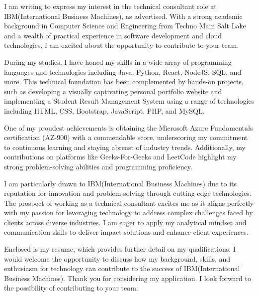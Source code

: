 I am writing to express my interest in the technical consultant role at IBM(International Business Machines), as advertised. With a strong academic background in Computer Science and Engineering from Techno Main Salt Lake and a wealth of practical experience in software development and cloud technologies, I am excited about the opportunity to contribute to your team.

During my studies, I have honed my skills in a wide array of programming languages and technologies including Java, Python, React, NodeJS, SQL, and more. This technical foundation has been complemented by hands-on projects, such as developing a visually captivating personal portfolio website and implementing a Student Result Management System using a range of technologies including HTML, CSS, Bootstrap, JavaScript, PHP, and MySQL.

One of my proudest achievements is obtaining the Microsoft Azure Fundamentals certification (AZ-900) with a commendable score, underscoring my commitment to continuous learning and staying abreast of industry trends. Additionally, my contributions on platforms like Geeks-For-Geeks and LeetCode highlight my strong problem-solving abilities and programming proficiency.

I am particularly drawn to IBM(International Business Machines) due to its reputation for innovation and problem-solving through cutting-edge technologies. The prospect of working as a technical consultant excites me as it aligns perfectly with my passion for leveraging technology to address complex challenges faced by clients across diverse industries. I am eager to apply my analytical mindset and communication skills to deliver impact solutions and enhance client experiences.

Enclosed is my resume, which provides further detail on my qualifications. I would welcome the opportunity to discuss how my background, skills, and enthusiasm for technology can contribute to the success of IBM(International Business Machines). Thank you for considering my application. I look forward to the possibility of contributing to your team.
